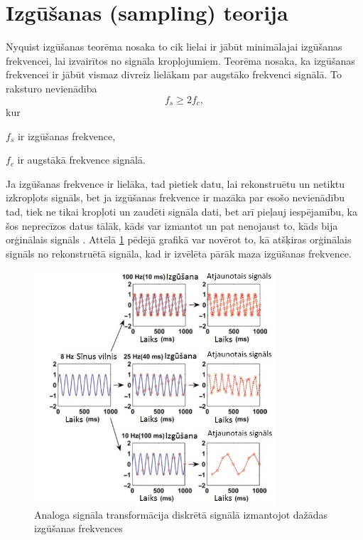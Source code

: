 \documentclass[12pt,paper=A4]{report}
\begin{document}
\section{Izgūšanas (sampling) teorija}

Nyquist izgūšanas teorēma nosaka to cik lielai ir jābūt minimālajai izgūšanas frekvencei, lai izvairītos no signāla kropļojumiem. Teorēma nosaka, ka izgūšanas frekvencei ir jābūt vismaz divreiz lielākam par augstāko frekvenci signālā. To raksturo nevienādība 
\begin{equation}
f_s\geq  2f_c,
\end{equation}
kur 

$f_s$ ir izgūšanas frekvence,

$f_c$ ir augstākā frekvence signālā.

Ja izgūšanas frekvence ir lielāka, tad pietiek datu, lai rekonstruētu un netiktu izkropļots signāls, bet ja izgūšanas frekvence ir mazāka par esošo nevienādību tad, tiek ne tikai kropļoti un zaudēti signāla dati, bet arī pieļauj iespējamību, ka šos neprecīzos datus tālāk, kāds var izmantot un pat nenojaust to, kāds bija orģinālais signāls \cite{http://redwood.berkeley.edu/bruno/npb261/aliasing.pdf}. Attēlā \ref{sampling} pēdējā grafikā var novērot to, kā atšķiras orģinālais signāls no rekonstruētā signāla, kad ir izvēlēta pārāk maza izgūšanas frekvence. 

\begin{figure}[H] \centering
\includegraphics[width=0.80\textwidth]{sample} 
\caption{Analoga signāla transformācija diskrētā signālā izmantojot dažādas izgūšanas frekvences \cite{AnalogandDigitalSignal}}  \label{sampling} 
\end{figure}
\end{document}
